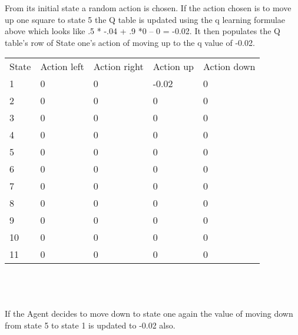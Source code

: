 From its initial state a random action is chosen. If the action chosen is to move up one square to state 5 the Q table is updated using the q learning formulae above which looks like   .5 * -.04  + .9 *0 – 0 = -0.02.
It then populates the Q table's row of State one's action of moving up to the q value of -0.02.

\begin{tabular}{lllll}
State & Action left & Action right & Action up & Action down \\
1     & 0           & 0            & -0.02     & 0           \\
2     & 0           & 0            & 0         & 0           \\
3     & 0           & 0            & 0         & 0           \\
4     & 0           & 0            & 0         & 0           \\
5     & 0           & 0            & 0         & 0           \\
6     & 0           & 0            & 0         & 0           \\
7     & 0           & 0            & 0         & 0           \\
8     & 0           & 0            & 0         & 0           \\
9     & 0           & 0            & 0         & 0           \\
10    & 0           & 0            & 0         & 0           \\
11    & 0           & 0            & 0         & 0          
\end{tabular}
\\
\\
\\
If the Agent decides to move down to state one again the value of moving down from state 5 to state 1 is updated to -0.02 also.
\\

